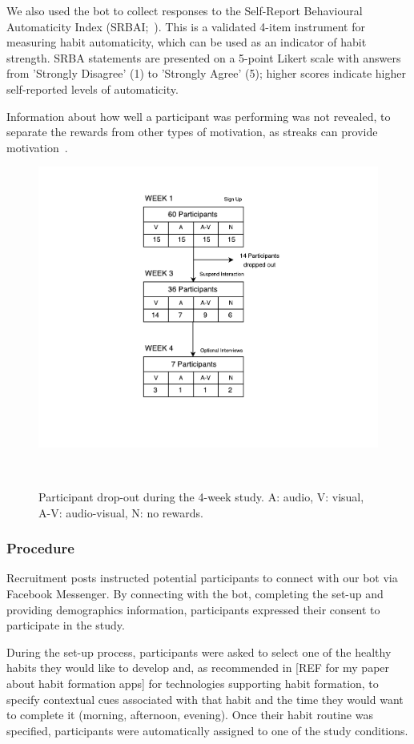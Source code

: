 \documentclass{scaffold/sigchi}
\begin{document}
We also used the bot to collect responses to the Self-Report Behavioural Automaticity Index (SRBAI;~\cite{article_4q_SRBAI}). This is a validated 4-item instrument for measuring habit automaticity, which can be used as an indicator of habit strength. SRBA statements are presented on a 5-point Likert scale with answers from 'Strongly Disagree' (1) to 'Strongly Agree' (5); higher scores indicate higher self-reported levels of automaticity.

Information about how well a participant was performing was not revealed, to separate the rewards from other types of motivation, as streaks can provide motivation~\cite{article_dont_kick_habit}. 



\begin{figure}
  \centering
  \includegraphics[width=.95\columnwidth]{figures/study-flow.pdf}
  \caption{Participant drop-out during the 4-week study. A: audio, V: visual, A-V: audio-visual, N: no rewards.}~\label{fig:study_dropout}
\end{figure}

\subsubsection{Procedure}
Recruitment posts instructed potential participants to connect with our bot via Facebook Messenger. By connecting with the bot, completing the set-up and providing demographics information, participants expressed their consent to participate in the study.

During the set-up process, participants were asked to select one of the healthy habits they would like to develop and, as recommended in [REF for my paper about habit formation apps] for technologies supporting habit formation, to specify contextual cues associated with that habit and the time they would want to complete it (morning, afternoon, evening). Once their habit routine was specified, participants were automatically assigned to one of the study conditions. 
\end{document}
